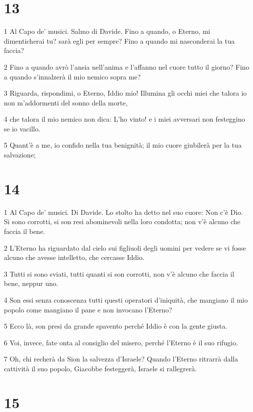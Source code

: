 \chapter{13}

\par 1 Al Capo de' musici. Salmo di Davide. Fino a quando, o Eterno, mi dimenticherai tu? sarà egli per sempre? Fino a quando mi nasconderai la tua faccia?
\par 2 Fino a quando avrò l'ansia nell'anima e l'affanno nel cuore tutto il giorno? Fino a quando s'innalzerà il mio nemico sopra me?
\par 3 Riguarda, rispondimi, o Eterno, Iddio mio! Illumina gli occhi miei che talora io non m'addormenti del sonno della morte,
\par 4 che talora il mio nemico non dica: L'ho vinto! e i miei avversari non festeggino se io vacillo.
\par 5 Quant'è a me, io confido nella tua benignità; il mio cuore giubilerà per la tua salvazione;

\chapter{14}

\par 1 Al Capo de' musici. Di Davide. Lo stolto ha detto nel suo cuore: Non c'è Dio. Si sono corrotti, si son resi abominevoli nella loro condotta; non v'è alcuno che faccia il bene.
\par 2 L'Eterno ha riguardato dal cielo sui figliuoli degli uomini per vedere se vi fosse alcuno che avesse intelletto, che cercasse Iddio.
\par 3 Tutti si sono sviati, tutti quanti si son corrotti, non v'è alcuno che faccia il bene, neppur uno.
\par 4 Son essi senza conoscenza tutti questi operatori d'iniquità, che mangiano il mio popolo come mangiano il pane e non invocano l'Eterno?
\par 5 Ecco là, son presi da grande spavento perché Iddio è con la gente giusta.
\par 6 Voi, invece, fate onta al consiglio del misero, perché l'Eterno è il suo rifugio.
\par 7 Oh, chi recherà da Sion la salvezza d'Israele? Quando l'Eterno ritrarrà dalla cattività il suo popolo, Giacobbe festeggerà, Israele si rallegrerà.

\chapter{15}

